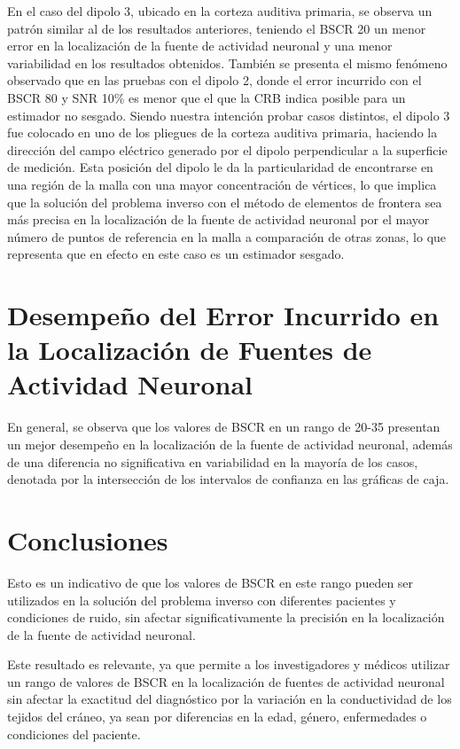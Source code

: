 En el caso del dipolo 3, ubicado en la corteza auditiva primaria, se observa un patrón similar al de los resultados anteriores, teniendo el BSCR 20 un menor error en la localización de la fuente de actividad neuronal y una menor variabilidad en los resultados obtenidos.
También se presenta el mismo fenómeno observado que en las pruebas con el dipolo 2, donde el error incurrido con el BSCR 80 y SNR 10\% es menor que el que la CRB indica posible para un estimador no sesgado.
Siendo nuestra intención probar casos distintos, el dipolo 3 fue colocado en uno de los pliegues de la corteza auditiva primaria, haciendo la dirección del campo eléctrico generado por el dipolo perpendicular a la superficie de medición.
Esta posición del dipolo le da la particularidad de encontrarse en una región de la malla con una mayor concentración de vértices, lo que implica que la solución del problema inverso con el método de elementos de frontera sea más precisa en la localización de la fuente de actividad neuronal por el mayor número de puntos de referencia en la malla a comparación de otras zonas, lo que representa que en efecto en este caso es un estimador sesgado.

\section{Desempeño del Error Incurrido en la Localización de Fuentes de Actividad Neuronal}

En general, se observa que los valores de BSCR en un rango de 20-35 presentan un mejor desempeño en la localización de la fuente de actividad neuronal, además de una diferencia no significativa en variabilidad en la mayoría de los casos, denotada por la intersección de los intervalos de confianza en las gráficas de caja.

\section{Conclusiones}


Esto es un indicativo de que los valores de BSCR en este rango pueden ser utilizados en la solución del problema inverso con diferentes pacientes y condiciones de ruido, sin afectar significativamente la precisión en la localización de la fuente de actividad neuronal.

Este resultado es relevante, ya que permite a los investigadores y médicos utilizar un rango de valores de BSCR en la localización de fuentes de actividad neuronal sin afectar la exactitud del diagnóstico por la variación en la conductividad de los tejidos del cráneo, ya sean por diferencias en la edad, género, enfermedades o condiciones del paciente.